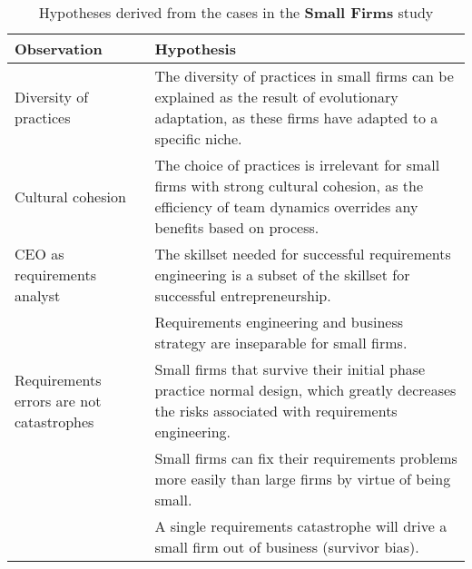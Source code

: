 \begin{table}[tbp]
\caption{\label{tab:SmallFirmsHyps} Hypotheses derived from the cases in the \textbf{Small Firms} study}
\centering
\footnotesize{\begin{tabular}{p{4.0cm}p{9.6cm}}
\hline \hline
\vspace{1pt} \bfseries Observation & \vspace{1pt} \bfseries Hypothesis \\
\hline
\vspace{0.5pt} Diversity of practices & \vspace{0.5pt} The diversity of practices in small firms can be explained as the result of evolutionary adaptation, as these firms have adapted to a specific niche. \\
\hline
\vspace{0.5pt} Cultural cohesion & \vspace{0.5pt} The choice of practices is irrelevant for small firms with strong cultural cohesion, as the efficiency of team dynamics overrides any benefits based on process. \\
\hline
\vspace{0.5pt} CEO as requirements analyst & \vspace{0.5pt} The skillset needed for successful requirements engineering is a subset of the skillset for successful entrepreneurship. \\
\vspace{0.5pt}  & \vspace{0.5pt} Requirements engineering and business strategy are inseparable for small firms. \\
\hline
\vspace{0.5pt} Requirements errors are not catastrophes & \vspace{0.5pt} Small firms that survive their initial phase practice normal design, which greatly decreases the risks associated with requirements engineering. \\
\vspace{0.5pt}  & \vspace{0.5pt} Small firms can fix their requirements problems more easily than large firms by virtue of being small. \\
\vspace{0.5pt} & \vspace{0.5pt} A single requirements catastrophe will drive a small firm out of business (survivor bias). \\
\hline
\end{tabular}}
\end{table}




